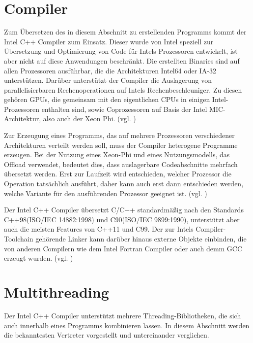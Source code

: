 \documentclass[../main.tex]{subfiles}
\begin{document}
\section{Compiler}
Zum Übersetzen des in diesem Abschnitt zu erstellenden Programms kommt der Intel C++ Compiler zum Einsatz. Dieser wurde von Intel speziell zur Übersetzung und Optimierung von Code für Intels Prozessoren entwickelt, ist aber nicht auf diese Anwendungen beschränkt. Die erstellten Binaries sind auf allen Prozessoren ausführbar, die die Architekturen Intel64 oder IA-32 unterstützen. Darüber unterstützt der Compiler die Auslagerung von parallelisierbaren Rechenoperationen auf Intels Rechenbeschleuniger. Zu diesen gehören GPUs, die gemeinsam mit den eigentlichen CPUs in einigen Intel-Prozessoren enthalten sind, sowie Coprozessoren auf Basis der Intel MIC-Architektur, also auch der Xeon Phi. (vgl. \cite{iccDocumentation})

Zur Erzeugung eines Programms, das auf mehrere Prozessoren verschiedener Architekturen verteilt werden soll, muss der Compiler heterogene Programme erzeugen. Bei der Nutzung eines Xeon-Phi und eines Nutzungsmodells, das Offload verwendet, bedeutet dies, dass auslagerbare Codeabschnitte mehrfach übersetzt werden. Erst zur Laufzeit wird entschieden, welcher Prozessor die Operation tatsächlich ausführt, daher kann auch erst dann entschieden werden, welche Variante für den ausführenden Prozessor geeignet ist. (vgl. \cite{iccDocumentation})

Der Intel C++ Compiler übersetzt C/C++ standardmäßig nach den Standards C++98(ISO/IEC 14882:1998) und C90(ISO/IEC 9899:1990), unterstützt aber auch die meisten Features von C++11 und C99. Der zur Intels Compiler-Toolchain gehörende Linker kann darüber hinaus externe Objekte einbinden, die von anderen Compilern wie dem Intel Fortran Compiler oder auch demm GCC erzeugt wurden. (vgl. \cite{iccDocumentation})

\section{Multithreading}
Der Intel C++ Compiler unterstützt mehrere Threading-Bibliotheken, die sich auch innerhalb eines Programms kombinieren lassen. In diesem Abschnitt werden die bekanntesten Vertreter  vorgestellt und untereinander verglichen. 
\end{document}
